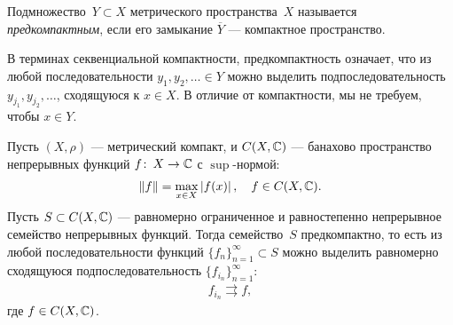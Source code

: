 \documentclass[../complex-analysis.tex]{subfiles}
\begin{document}
\begin{df}
 Подмножество~$ Y \subset X $ метрического пространства~$ X $ называется \emph{предкомпактным}, если его замыкание $ \overline Y $ --- компактное пространство.

 В терминах секвенциальной компактности, предкомпактность означает, что из любой последовательности $ y_1, y_2, \ldots \in Y $ можно выделить подпоследовательность $ y_{j_1}, y_{j_2}, \ldots $, сходящуюся к $ x \in X $. В отличие от компактности, мы не требуем, чтобы $ x \in Y $.
\end{df}

\begin{thm}
 \label{theorem:Arzela-Ascoli}
 Пусть $ (X,\rho) $ --- метрический компакт, и $ C(X,\mathbb{C}) $ --- банахово пространство непрерывных функций $ f \colon\,X \to \mathbb{C} $ с $ \sup $-нормой:
 \begin{align*}
  \left\| f \right\| = \max_{x \in X} \left| f(x) \right|, \quad f \in C(X,\mathbb{C}).
 \end{align*} Пусть $S \subset C(X,\mathbb{C})$ --- равномерно ограниченное и равностепенно непрерывное семейство непрерывных функций. Тогда семейство~$ S $ предкомпактно, то есть из любой последовательности функций $\{f_{n}\}_{n=1}^{\infty} \subset S$  можно выделить равномерно сходящуюся подпоследовательность $\{f_{i_n}\}_{n=1}^{\infty} $:
 \begin{align*}
  f_{i_n} \rightrightarrows f,
 \end{align*} где $ f \in C(X,\mathbb{C}) $.
\end{thm}
\end{document}

